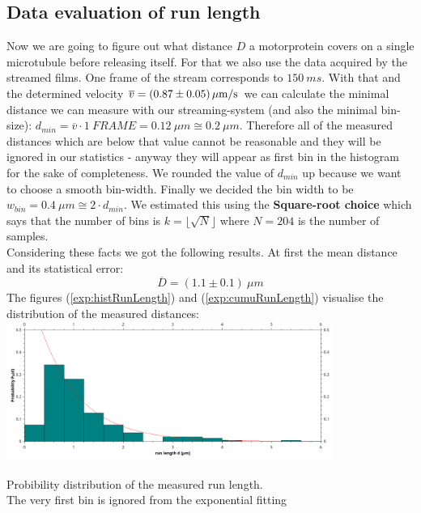     \subsection{Data evaluation of run length}
    	Now we are going to figure out what distance $D$ a motorprotein covers on a single microtubule before releasing itself. For that we also use the data acquired by the streamed films. One frame of the stream corresponds to $150\ \unit{ms}$. With that and the determined velocity $\overline v = \unit[(0.87 \pm 0.05)]{\mu m/s}$ we can calculate the minimal distance we can measure with our streaming-system (and also the minimal bin-size): $d_{min} = \overline{v} \cdot 1\ \unit{FRAME} = 0.12\ \unit{\mu m} \cong 0.2\ \unit{\mu m}$. Therefore all of the measured distances which are below that value cannot be reasonable and they will be ignored in our statistics - anyway they will appear as first bin in the histogram for the sake of completeness. We rounded the value of $d_{min}$ up because we want to choose a smooth bin-width. Finally we decided the bin width to be $w_{bin} = 0.4\ \unit{\mu m} \cong 2 \cdot {d_{min}}$. We estimated this using the \textbf{Square-root choice}\cite{wikiHisto} which says that the number of bins is $k = \lfloor\sqrt{N}\rfloor$ where $N = 204$ is the number of samples.\\
    	Considering these facts we got the following results. At first the mean distance and its statistical error:
    	\begin{equation*}
    		\overline{D} = (1.1 \pm 0.1)\ \unit{\mu m}
    	\end{equation*}
    	The figures (\ref{exp:histRunLength}) and  (\ref{exp:cumuRunLength}) visualise the distribution of the measured distances:
    	 \minipanf
    	 	\centering
    	 	\captionsetup{justification=centering,margin=2cm}
    	 		\includegraphics[width = 0.8\textwidth, keepaspectratio]{pic/histo_runlength_rel.png}
    	 	\caption{Probibility distribution of the measured run length.\\ The very first bin is ignored from the exponential fitting}
    	 	\label{exp:histRunLength}
